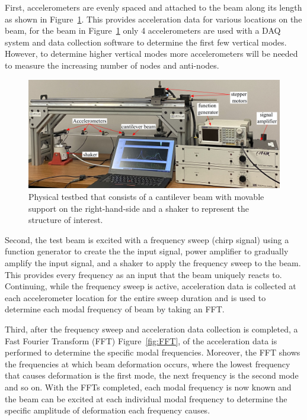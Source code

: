 \documentclass[12pt,letter]{article}
\numberwithin{ex}{section} %
\numberwithin{re}{section} %
\begin{document}
First, accelerometers are evenly spaced and attached to the beam along its length as shown in Figure~\ref{fig:PhysicalTestBed}. This provides acceleration data for various locations on the beam, for the beam in Figure~\ref{fig:PhysicalTestBed} only 4 accelerometers are used with a DAQ system and data collection software to determine the first few vertical modes. However, to determine higher vertical modes more accelerometers will be needed to measure the increasing number of nodes and anti-nodes.    

\begin{figure}[b]
	\centering 
	\includegraphics*[width= 1\linewidth]{figures/Testbed/PhysicalTestbed.png}
	\vspace{0.1cm}
	\caption{Physical testbed that consists of a cantilever beam with movable support on the right-hand-side and a shaker to represent the structure of interest.}
	\label{fig:PhysicalTestBed}
\end{figure}


Second, the test beam is excited with a frequency sweep (chirp signal) using a function generator to create the the input signal, power amplifier to gradually amplify the input signal, and a shaker to apply the frequency sweep to the beam. This provides every frequency as an input that the beam uniquely reacts to. Continuing, while the frequency sweep is active, acceleration data is collected at each accelerometer location for the entire sweep duration and is used to determine each modal frequency of beam by taking an FFT.


Third, after the frequency sweep and acceleration data collection is completed, a Fast Fourier Transform (FFT) Figure~\ref{fig:FFT}, of the acceleration data is performed to determine the specific modal frequencies. Moreover, the FFT shows the frequencies at which beam deformation occurs, where the lowest frequency that causes deformation is the first mode, the next frequency is the second mode and so on. With the FFTs completed, each modal frequency is now known and the beam can be excited at each individual modal frequency to determine the specific amplitude of deformation each frequency causes. 
\end{document}

